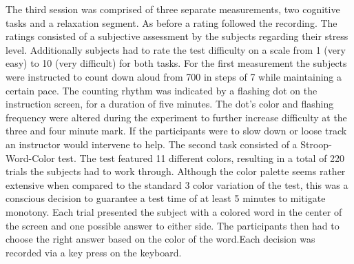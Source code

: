 The third session was comprised of three separate measurements, two cognitive tasks and a relaxation segment. As before a rating followed the recording. The ratings consisted of a subjective assessment by the subjects regarding their stress level. Additionally subjects had to rate the test difficulty on a scale from 1 (very easy) to 10 (very difficult) for both tasks. 
For the first measurement the subjects were instructed to count down aloud from 700 in steps of 7 while maintaining a certain pace. The counting rhythm was indicated by a flashing dot on the instruction screen, for a duration of five minutes. The dot's color and flashing frequency were altered during the experiment to further increase difficulty at the three and four minute mark. If the participants were to slow down or loose track an instructor would intervene to help.
The second task consisted of a Stroop-Word-Color test. The test featured 11 different colors, resulting in a total of 220 trials the subjects had to work through. Although the color palette seems rather extensive when compared to the standard 3 color variation of the test, this was a conscious decision to guarantee a test time of at least 5 minutes to mitigate monotony. Each trial presented the subject with a colored word in the center of the screen and one possible answer to either side. The participants then had to choose the right answer based on the color of the word.Each decision was recorded via a key press on the keyboard. 



